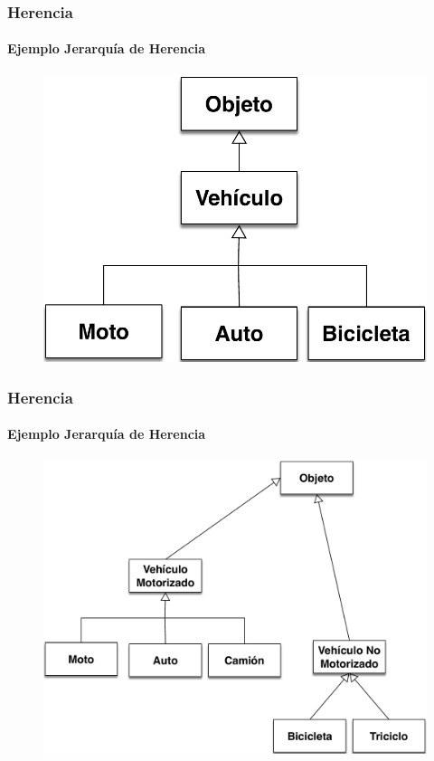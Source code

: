 \documentclass{beamer}
\begin{document}
  \begin{frame}
    \frametitle{Herencia}
    \framesubtitle{Ejemplo Jerarquía de Herencia}
    \begin{center}
      \begin{figure}[!t]
        \includegraphics[scale=.6]{images/jerarquia_1}
      \end{figure}
    \end{center}
  \end{frame}

  \begin{frame}
    \frametitle{Herencia}
    \framesubtitle{Ejemplo Jerarquía de Herencia}
    \begin{center}
      \begin{figure}[!t]
        \includegraphics[scale=.4]{images/jerarquia_2}
      \end{figure}
    \end{center}
  \end{frame}
\end{document}
